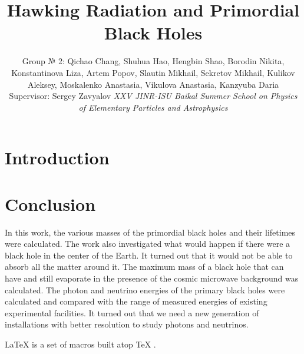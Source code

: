 \documentclass[12pt]{article}
\begin{document}
\title{Hawking Radiation and Primordial Black Holes}

\author{
	Group № 2: Qichao Chang, Shuhua Hao, Hengbin Shao, Borodin Nikita, Konstantinova Liza, Artem Popov, Slautin Mikhail, Sekretov Mikhail, Kulikov Aleksey, Moskalenko Anastasia, Vikulova Anastasia, Kanzyuba Daria\\ Supervisor: Sergey Zavyalov \vskip 10mm \textit{XXV JINR-ISU Baikal Summer School on Physics of Elementary Particles and Astrophysics}}



\maketitle
\newpage
\section{Introduction}

\section{Conclusion}
\indent In this work, the various masses of the primordial black holes and their lifetimes were calculated. The work also investigated what would happen if there were a  black hole in the center of the Earth. It turned out that it would not be able to absorb all the matter around it. The maximum mass of a black hole that can have and still evaporate in the presence of the cosmic microwave background was calculated. The photon and neutrino energies of the primary black holes were calculated and compared with the range of measured energies of existing experimental facilities. It turned out that we need a new generation of installations with better resolution to study photons and neutrinos.


%
%

\LaTeX{} \cite{MacGibbon_1998} is a set of macros built atop \TeX{} \cite{MacGibbon_1998}.
\end{document}
